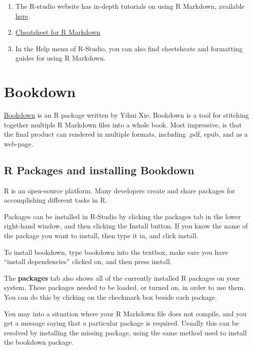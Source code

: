 \documentclass[]{book}
\providecommand{\tightlist}{%
  \setlength{\itemsep}{0pt}\setlength{\parskip}{0pt}}
\theoremstyle{definition}
\theoremstyle{definition}
\theoremstyle{definition}
\theoremstyle{remark}
\begin{document}
\begin{enumerate}
\def\labelenumi{\arabic{enumi}.}
\tightlist
\item
  The R-studio website has in-depth tutorials on using R Markdown,
  available \href{http://rmarkdown.rstudio.com/lesson-1.html}{here}.
\item
  \href{http://rmarkdown.rstudio.com/lesson-15.html}{Cheatsheet for R
  Markdown}
\item
  In the Help menu of R-Studio, you can also find cheetsheats and
  formatting guides for using R Markdown.
\end{enumerate}

\chapter{Bookdown}\label{bookdown-1}

\href{https://bookdown.org/yihui/bookdown/}{Bookdown} is an R package
written by Yihui Xie. Bookdown is a tool for stitching together multiple
R Markdown files into a whole book. Most impressive, is that the final
product can rendered in multiple formats, including .pdf, epub, and as a
web-page.

\section{R Packages and installing
Bookdown}\label{r-packages-and-installing-bookdown}

R is an open-source platform. Many developers create and share packages
for accomplishing different tasks in R.

Packages can be installed in R-Studio by clicking the packages tab in
the lower right-hand window, and then clicking the Install button. If
you know the name of the package you want to install, then type it in,
and click install.

To install bookdown, type bookdown into the textbox, make sure you have
``install dependencies'' clicked on, and then press install.

The \textbf{packages} tab also shows all of the currently installed R
packages on your system. These packages needed to be loaded, or turned
on, in order to use them. You can do this by clicking on the checkmark
box beside each package.

You may into a situation where your R Markdown file does not compile,
and you get a message saying that a particular package is required.
Usually this can be resolved by installing the missing package, using
the same method used to install the bookdown package.
\end{document}

